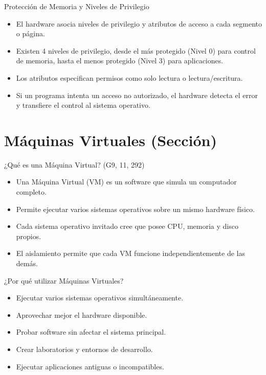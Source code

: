 \documentclass[presentation]{beamer}
\begin{document}
\begin{frame}[label={sec:orgfd184e7}]{Protección de Memoria y Niveles de Privilegio}
\begin{itemize}
\item El hardware asocia niveles de privilegio y atributos de acceso a cada segmento o página.
\item Existen 4 niveles de privilegio, desde el más protegido (Nivel 0) para control de memoria, hasta el menos protegido (Nivel 3) para aplicaciones.
\item Los atributos especifican permisos como solo lectura o lectura/escritura.
\item Si un programa intenta un acceso no autorizado, el hardware detecta el error y transfiere el control al sistema operativo.
\end{itemize}
\end{frame}

\section{Máquinas Virtuales (Sección)}
\label{sec:org6f322fd}

\begin{frame}[label={sec:orga8f468e}]{¿Qué es una Máquina Virtual? (G9, 11, 292)}
\begin{itemize}
\item Una Máquina Virtual (VM) es un software que simula un computador
completo.
\item Permite ejecutar varios sistemas operativos sobre un mismo hardware físico.
\item Cada sistema operativo invitado cree que posee CPU, memoria y disco propios.
\item El aislamiento permite que cada VM funcione independientemente de las demás.
\end{itemize}
\end{frame}

\begin{frame}[label={sec:org21b1cf8}]{¿Por qué utilizar Máquinas Virtuales?}
\begin{itemize}
\item Ejecutar varios sistemas operativos simultáneamente.
\item Aprovechar mejor el hardware disponible.
\item Probar software sin afectar el sistema principal.
\item Crear laboratorios y entornos de desarrollo.
\item Ejecutar aplicaciones antiguas o incompatibles.
\end{itemize}
\end{frame}
\end{document}
